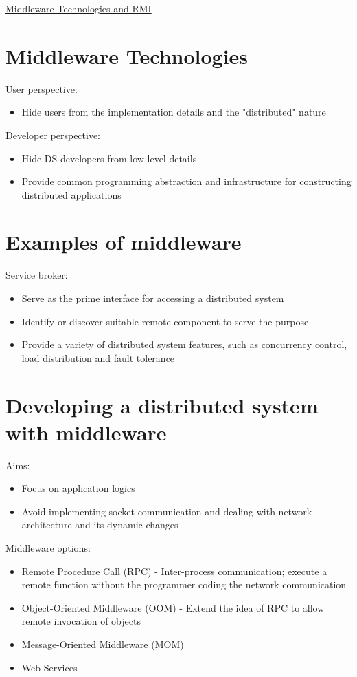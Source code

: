 \documentclass{article}[18pt]
\begin{document}
\begin{center}
\underline{\huge Middleware Technologies and RMI}
\end{center}
\section{Middleware Technologies}
User perspective:
\begin{itemize}
	\item Hide users from the implementation details and the "distributed" nature
\end{itemize}
Developer perspective:
\begin{itemize}
	\item Hide DS developers from low-level details
	\item Provide common programming abstraction and infrastructure for constructing distributed applications
\end{itemize}
\section{Examples of middleware}
Service broker:
\begin{itemize}
	\item Serve as the prime interface for accessing a distributed system
	\item Identify or discover suitable remote component to serve the purpose
	\item Provide a variety of distributed system features, such as concurrency control, load distribution and fault tolerance
\end{itemize}
\section{Developing a distributed system with middleware}
Aims:
\begin{itemize}
	\item Focus on application logics
	\item Avoid implementing socket communication and dealing with network architecture and its dynamic changes
\end{itemize}
Middleware options:
\begin{itemize}
	\item Remote Procedure Call (RPC) - Inter-process communication; execute a remote function without the programmer coding the network communication
	\item Object-Oriented Middleware (OOM) - Extend the idea of RPC to allow remote invocation of objects
	\item Message-Oriented Middleware (MOM)
	\item Web Services
\end{itemize}
\end{document}
